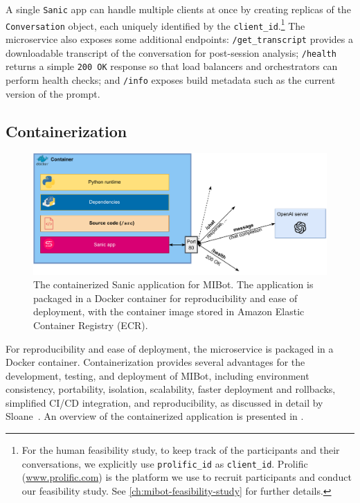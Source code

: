 A single \texttt{Sanic} app can handle multiple clients at once by creating replicas of the \texttt{Conversation} object, each uniquely identified by the \texttt{client\_id}.\footnote{For the human feasibility study, to keep track of the participants and their conversations, we explicitly use \texttt{prolific\_id} as \texttt{client\_id}. Prolific (\url{www.prolific.com}) is the platform we use to recruit participants and conduct our feasibility study. See \cref{ch:mibot-feasibility-study} for further details.} The microservice also exposes some additional endpoints: \texttt{/get\_transcript} provides a downloadable transcript of the conversation for post-session analysis; \texttt{/health} returns a simple \texttt{200 OK} response so that load balancers and orchestrators can perform health checks; and \texttt{/info} exposes build metadata such as the current version of the prompt.

\subsection{Containerization}

\begin{figure}[ht]
  \centering
  \includegraphics[width=0.7\linewidth]{fig/container.drawio.pdf} 
  \caption[Containerized MIBot Application]{The containerized Sanic application for MIBot. The application is packaged in a Docker container for reproducibility and ease of deployment, with the container image stored in Amazon Elastic Container Registry (ECR).}
  \label{fig:containerization}
\end{figure}

For reproducibility and ease of deployment, the microservice is packaged in a Docker container. Containerization provides several advantages for the development, testing, and deployment of MIBot, including environment consistency, portability, isolation, scalability, faster deployment and rollbacks, simplified CI/CD integration, and reproducibility, as discussed in detail by Sloane~\citep{sloane2025containerization}. An overview of the containerized application is presented in .

